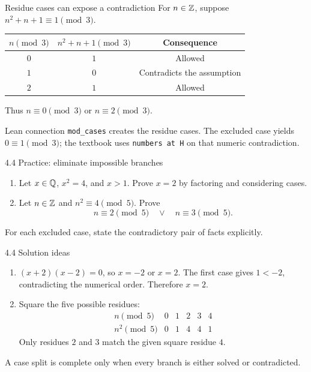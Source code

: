 \begin{frame}{Residue cases can expose a contradiction}
For $n\in\mathbb{Z}$, suppose $n^2+n+1\equiv1\pmod3$.
\begin{center}
\begin{tabular}{ccc}
\toprule
$n\pmod3$ & $n^2+n+1\pmod3$ & Consequence\\\midrule
$0$ & $1$ & Allowed\\
$1$ & $0$ & Contradicts the assumption\\
$2$ & $1$ & Allowed\\\bottomrule
\end{tabular}
\end{center}
Thus $n\equiv0\pmod3$ or $n\equiv2\pmod3$.
\begin{block}{Lean connection}
\texttt{mod\_cases} creates the residue cases. The excluded case yields $0\equiv1\pmod3$; the textbook uses \texttt{numbers at H} on that numeric contradiction.
\end{block}
\end{frame}

\begin{frame}{4.4 Practice: eliminate impossible branches}
\begin{enumerate}
\item Let $x\in\mathbb{Q}$, $x^2=4$, and $x>1$. Prove $x=2$ by factoring and considering cases.
\item Let $n\in\mathbb{Z}$ and $n^2\equiv4\pmod5$. Prove
\[
n\equiv2\pmod5\quad\lor\quad n\equiv3\pmod5.
\]
\end{enumerate}
For each excluded case, state the contradictory pair of facts explicitly.
\end{frame}

\begin{frame}{4.4 Solution ideas}
\begin{enumerate}
\item $(x+2)(x-2)=0$, so $x=-2$ or $x=2$. The first case gives $1<-2$, contradicting the numerical order. Therefore $x=2$.
\item Square the five possible residues:
\[
\begin{array}{c|ccccc}
n\pmod5&0&1&2&3&4\\\hline
n^2\pmod5&0&1&4&4&1
\end{array}
\]
Only residues $2$ and $3$ match the given square residue $4$.
\end{enumerate}
A case split is complete only when every branch is either solved or contradicted.
\end{frame}

